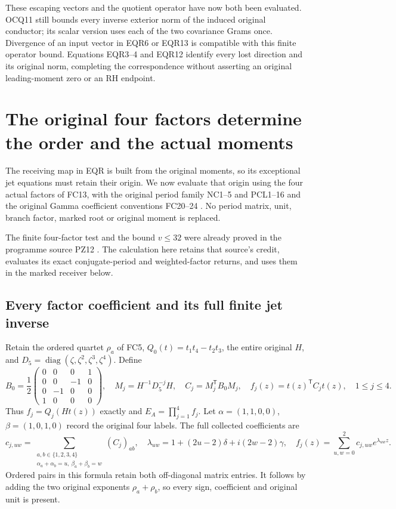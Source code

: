 \documentclass[11pt]{article}
\begin{document}
These escaping vectors and the quotient operator have now both been
evaluated. OCQ11 still bounds every inverse exterior norm of the
induced original conductor; its scalar version uses each of the
two covariance Grams once. Divergence of an input vector in
EQR6 or EQR13 is compatible with this finite operator bound.
Equations EQR3--4 and EQR12 identify every lost direction and its
original norm, completing the correspondence without asserting an
original leading-moment zero or an RH endpoint.


\section{The original four factors determine the order and the actual moments}
The receiving map in EQR is built from the original moments, so its
exceptional jet equations must retain their origin. We now evaluate
that origin using the four actual factors of FC13, with the original
period family NC1--5 and PCL1--16 \cite{NC,Cumulative,PCLOriginal} and the original Gamma
coefficient conventions FC20--24 \cite{WCF}. No period matrix, unit,
branch factor, marked root or original moment is replaced.

The finite four-factor test and the bound $v\le32$ were already
proved in the programme source PZ12 \cite{PeriodZeroOriginal}. The
calculation here retains that source's credit, evaluates its exact
conjugate-period and weighted-factor returns, and uses them in the
marked receiver below.

\subsection{Every factor coefficient and its full finite jet inverse}
Retain the ordered quartet $\rho_a$ of FC5, $Q_0(t)=t_1t_4-t_2t_3$,
the entire original $H$, and $D_5=\operatorname{diag}(\zeta,\zeta^2,
\zeta^3,\zeta^4)$. Define
\[
 B_0=\frac12\begin{pmatrix}0&0&0&1\\0&0&-1&0\\
 0&-1&0&0\\1&0&0&0\end{pmatrix},\quad
 M_j=H^{-1}D_5^{-j}H,\quad C_j=M_j^{\mathsf T}B_0M_j,
 \quad f_j(z)=t(z)^{\mathsf T}C_jt(z),\quad 1\le j\le4.
 \tag{OFM1}
\]
Thus $f_j=Q_j(Ht(z))$ exactly and $E_A=\prod_{j=1}^4f_j$.
Let $\alpha=(1,1,0,0)$, $\beta=(1,0,1,0)$ record the original
four labels. The full collected coefficients are
\[
 c_{j,uw}=\sum_{\substack{a,b\in\{1,2,3,4\}\\
       \alpha_a+\alpha_b=u,\ \beta_a+\beta_b=w}}(C_j)_{ab},
 \quad \lambda_{uw}=1+(2u-2)\delta+i(2w-2)\gamma,
 \quad f_j(z)=\sum_{u,w=0}^2c_{j,uw}e^{\lambda_{uw}z}.
 \tag{OFM2}
\]
Ordered pairs in this formula retain both off-diagonal matrix entries.
It follows by adding the two original exponents $\rho_a+\rho_b$,
so every sign, coefficient and original unit is present.
\end{document}
